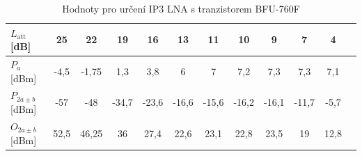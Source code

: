 \documentclass[11pt,a4paper]{article}
\begin{document}
\begin{table}[!ht]
\begin{center}
\begin{tabular}{| l || c | c | c | c | c | c | c | c | c | c | c |}
    \hline
    $L_{\mathrm{att}}$ [dB] & 25 & 22 & 19 & 16 & 13 & 11 & 10 & 9 & 7 & 4 \\
    \hline
    $P_a$ [dBm] & -4,5 & -1,75 & 1,3 & 3,8 & 6 & 7 & 7,2 & 7,3 & 7,3 & 7,1 \\
    \hline
    $P_{2a \pm b}$ [dBm] & -57 & -48 & -34,7 & -23,6 & -16,6 & -15,6 & -16,2 & -16,1 & -11,7 & -5,7 \\
    \hline\hline
    $O_{2a \pm b}$ [dBm] & 52,5 & 46,25 & 36 & 27,4 & 22,6 & 23,1 & 22,8 & 23,5 & 19 & 12,8 \\
    \hline
\end{tabular}
\caption{Hodnoty pro určení IP3 LNA s tranzistorem BFU-760F}
\label{table:BFU760F-intercept}
\end{center}
\end{table}
\end{document}
